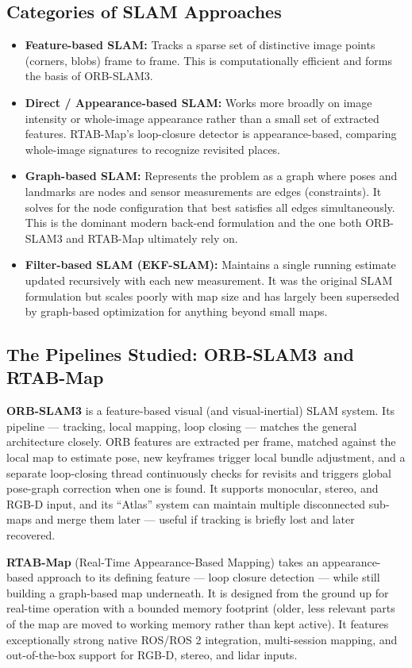 \documentclass[11pt,a4paper]{article}
\begin{document}
\subsection{Categories of SLAM Approaches}
\begin{itemize}
    \item \textbf{Feature-based SLAM:} Tracks a sparse set of distinctive image points (corners, blobs) frame to frame. This is computationally efficient and forms the basis of ORB-SLAM3.
    \item \textbf{Direct / Appearance-based SLAM:} Works more broadly on image intensity or whole-image appearance rather than a small set of extracted features. RTAB-Map's loop-closure detector is appearance-based, comparing whole-image signatures to recognize revisited places.
    \item \textbf{Graph-based SLAM:} Represents the problem as a graph where poses and landmarks are nodes and sensor measurements are edges (constraints). It solves for the node configuration that best satisfies all edges simultaneously. This is the dominant modern back-end formulation and the one both ORB-SLAM3 and RTAB-Map ultimately rely on.
    \item \textbf{Filter-based SLAM (EKF-SLAM):} Maintains a single running estimate updated recursively with each new measurement. It was the original SLAM formulation but scales poorly with map size and has largely been superseded by graph-based optimization for anything beyond small maps.
\end{itemize}

\subsection{The Pipelines Studied: ORB-SLAM3 and RTAB-Map}
\textbf{ORB-SLAM3} is a feature-based visual (and visual-inertial) SLAM system. Its pipeline --- tracking, local mapping, loop closing --- matches the general architecture closely. ORB features are extracted per frame, matched against the local map to estimate pose, new keyframes trigger local bundle adjustment, and a separate loop-closing thread continuously checks for revisits and triggers global pose-graph correction when one is found. It supports monocular, stereo, and RGB-D input, and its ``Atlas'' system can maintain multiple disconnected sub-maps and merge them later --- useful if tracking is briefly lost and later recovered.

\textbf{RTAB-Map} (Real-Time Appearance-Based Mapping) takes an appearance-based approach to its defining feature --- loop closure detection --- while still building a graph-based map underneath. It is designed from the ground up for real-time operation with a bounded memory footprint (older, less relevant parts of the map are moved to working memory rather than kept active). It features exceptionally strong native ROS/ROS 2 integration, multi-session mapping, and out-of-the-box support for RGB-D, stereo, and lidar inputs.
\end{document}
